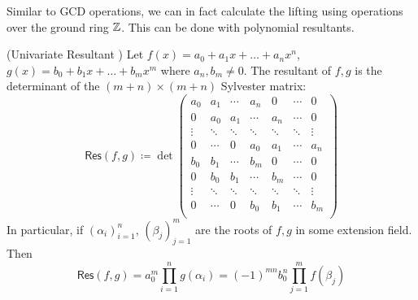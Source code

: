 Similar to GCD operations, we can in fact calculate the lifting using operations over the ground ring \(\mathbb{Z}\). This can be done with polynomial resultants.
\begin{definition}{(Univariate Resultant \cite{MISC:WikiResultant})} \label{def:Resultant}
    Let \(f(x) = a_0 + a_1 x + \ldots + a_n x^n\), \(g(x) = b_0 + b_1 x + \ldots + b_m x^m\) where \(a_n, b_m \neq 0\). The resultant of \(f, g\) is the determinant of the \((m+n)\times(m+n)\) Sylvester matrix:
    \[\mathsf{Res}(f, g) \coloneq \det
        \begin{pmatrix}
            a_0 & a_1 & \cdots & a_n & 0 & \cdots & 0 \\
            0 & a_0 & a_1 & \cdots & a_n & \cdots & 0 \\
            \vdots & \ddots & \ddots & \ddots & \ddots & \ddots & \vdots \\
            0 & \cdots & 0 & a_0 & a_1 & \cdots & a_n \\
            b_0 & b_1 & \cdots & b_m & 0 & \cdots & 0 \\
            0 & b_0 & b_1 & \cdots & b_m & \cdots & 0 \\
            \vdots & \ddots & \ddots & \ddots & \ddots & \ddots & \vdots \\
            0 & \cdots & 0 & b_0 & b_1 & \cdots & b_m \\
            \end{pmatrix}
    \]
    In particular, if \((\alpha_i)_{i=1}^n,\, (\beta_j)_{j=1}^m\) are the roots of \(f, g\) in some extension field. Then
    \[\mathsf{Res}(f,g) = a_0^m \prod_{i=1}^{n}g(\alpha_i) = (-1)^{mn}b_0^n \prod_{j=1}^{m} f(\beta_j)\]
\end{definition}

